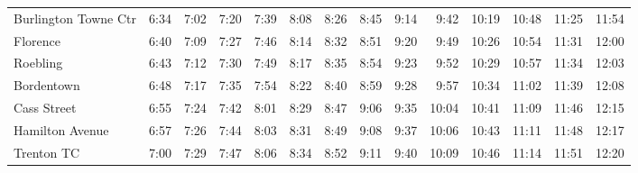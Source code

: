 \begin{center}
\begin{tabular}{@{}lrrrrrrrrrrrrr@{}}
Burlington Towne Ctr & 6:34 & 7:02 & 7:20 & 7:39 & 8:08 & 8:26 & 8:45 & 9:14 & 9:42 & 10:19 & 10:48 & 11:25 & 11:54 \\
Florence & 6:40 & 7:09 & 7:27 & 7:46 & 8:14 & 8:32 & 8:51 & 9:20 & 9:49 & 10:26 & 10:54 & 11:31 & 12:00 \\
Roebling & 6:43 & 7:12 & 7:30 & 7:49 & 8:17 & 8:35 & 8:54 & 9:23 & 9:52 & 10:29 & 10:57 & 11:34 & 12:03 \\
Bordentown & 6:48 & 7:17 & 7:35 & 7:54 & 8:22 & 8:40 & 8:59 & 9:28 & 9:57 & 10:34 & 11:02 & 11:39 & 12:08 \\
Cass Street & 6:55 & 7:24 & 7:42 & 8:01 & 8:29 & 8:47 & 9:06 & 9:35 & 10:04 & 10:41 & 11:09 & 11:46 & 12:15 \\
Hamilton Avenue & 6:57 & 7:26 & 7:44 & 8:03 & 8:31 & 8:49 & 9:08 & 9:37 & 10:06 & 10:43 & 11:11 & 11:48 & 12:17 \\
Trenton TC & 7:00 & 7:29 & 7:47 & 8:06 & 8:34 & 8:52 & 9:11 & 9:40 & 10:09 & 10:46 & 11:14 & 11:51 & 12:20 \\
\bottomrule\end{tabular}\end{center}
